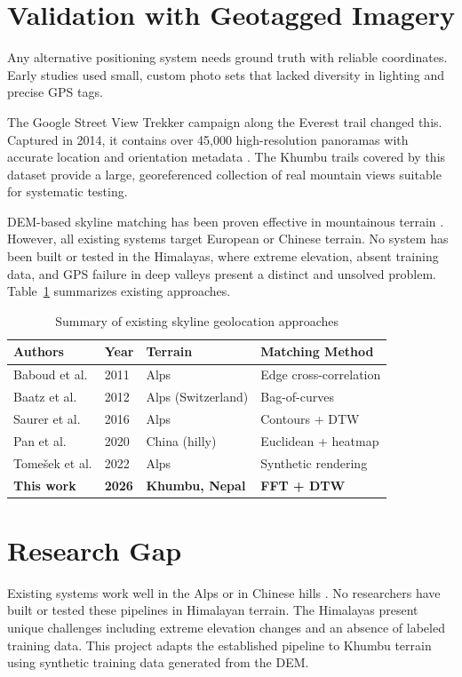 \section{Validation with Geotagged Imagery}
Any alternative positioning system needs ground truth with reliable coordinates. Early studies used small, custom photo sets that lacked diversity in lighting and precise GPS tags.

The Google Street View Trekker campaign along the Everest trail \cite{google2015streetview} changed this. Captured in 2014, it contains over 45,000 high-resolution panoramas with accurate location and orientation metadata \cite{google2015streetview}. The Khumbu trails covered by this dataset provide a large, georeferenced collection of real mountain views suitable for systematic testing.

DEM-based skyline matching has been proven effective in mountainous 
terrain \cite{baboud2011automatic, baatz2012large, saurer2016image, 
pan2020camera, tomesek2022cross}. However, all existing systems target 
European or Chinese terrain. No system has been built or tested in the 
Himalayas, where extreme elevation, absent training data, and GPS 
failure in deep valleys present a distinct and unsolved problem. 
Table~\ref{tab:litreview} summarizes existing approaches.

\begin{table}[h]
\centering
\caption{Summary of existing skyline geolocation approaches}
\label{tab:litreview}
\begin{tabular}{llll}
\toprule
Authors & Year & Terrain & Matching Method \\
\midrule
Baboud et al. \cite{baboud2011automatic} & 2011 & Alps & Edge cross-correlation \\
Baatz et al. \cite{baatz2012large} & 2012 & Alps (Switzerland) & Bag-of-curves \\
Saurer et al. \cite{saurer2016image} & 2016 & Alps & Contours + DTW \\
Pan et al. \cite{pan2020camera} & 2020 & China (hilly) & Euclidean + heatmap \\
Tomešek et al. \cite{tomesek2022cross} & 2022 & Alps & Synthetic rendering \\
\midrule
\textbf{This work} & \textbf{2026} & \textbf{Khumbu, Nepal} & \textbf{FFT + DTW} \\
\bottomrule
\end{tabular}
\end{table}

\section{Research Gap}
Existing systems work well in the Alps or in Chinese hills \cite{baboud2011automatic, baatz2012large, saurer2016image, tomesek2022cross, pan2020camera}. No researchers have built or tested these pipelines in Himalayan terrain. The Himalayas present unique challenges including extreme elevation changes and an absence of labeled training data. This project adapts the established pipeline to Khumbu terrain using synthetic training data generated from the DEM.
